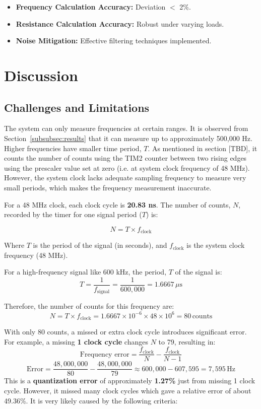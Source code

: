 \documentclass[12pt]{article}
\begin{document}
\begin{itemize}[leftmargin=2em]
    \item \textbf{Frequency Calculation Accuracy:} Deviation $<$ 2\%.
    \item \textbf{Resistance Calculation Accuracy:} Robust under varying loads.
    \item \textbf{Noise Mitigation:} Effective filtering techniques implemented.
\end{itemize}



\section{Discussion}
\subsection{Challenges and Limitations}

The system can only measure frequencies at certain ranges. It is observed from Section~\ref{subsubsec:results} that it can measure up to approximately 500,000 Hz. Higher frequencies have smaller time period, $T$. As mentioned in section [TBD], it counts the number of counts using the TIM2 counter between two rising edges using the prescaler value set at zero (i.e. at system clock frequency of 48 MHz).  However, the system clock lacks adequate sampling frequency to measure very small periods, which makes the frequency measurement inaccurate.

For a 48 MHz clock, each clock cycle is \textbf{20.83 ns}. The number of counts, \( N \), recorded by the timer for one signal period ($T$) is:

\begin{equation}\label{number_of_counts}
    N = T \times f_{\text{clock}}
\end{equation}

Where $T$ is the period of the signal (in seconds), and $f_{\text{clock}}$ is the system clock frequency (48 MHz).

For a high-frequency signal like 600 kHz, the period, $T$ of the signal is:
$$T = \frac{1}{f_{\text{signal}}} = \frac{1}{600,000} = 1.6667 \, \mu\text{s}$$

Therefore, the number of counts for this frequency are:
$$N = T \times f_{\text{clock}} = 1.6667 \times 10^{-6} \times 48 \times 10^6 = 80 \, \text{counts}$$

With only 80 counts, a missed or extra clock cycle introduces significant error. For example, a missing \textbf{1 clock cycle} changes $N$ to 79, resulting in:
    \[
    \text{Frequency error} = \frac{f_{\text{clock}}}{N} - \frac{f_{\text{clock}}}{N-1}
    \]
    \[
    \text{Error} = \frac{48,000,000}{80} - \frac{48,000,000}{79} \approx 600,000 - 607,595 = 7,595 \, \text{Hz}
    \]
This is a \textbf{quantization error} of approximately \textbf{1.27\%} just from missing 1 clock cycle. However, it missed many clock cycles which gave a relative error of about 49.36\%. It is very likely caused by the following criteria:
\end{document}
